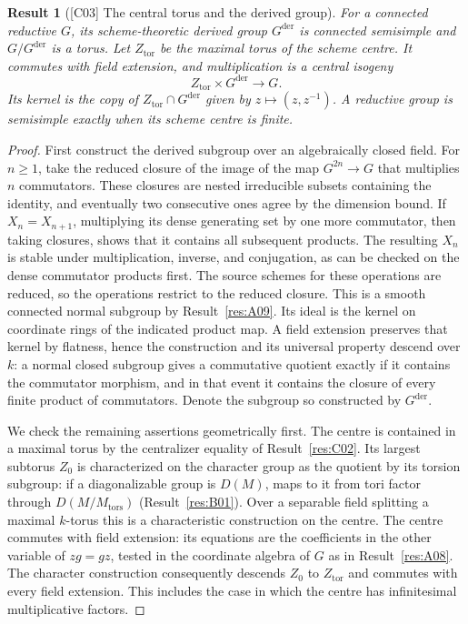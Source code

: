 \documentclass[11pt,a4paper,openany,oneside]{book}
\theoremstyle{resultstyle}
\newtheorem{statement}{Result}[chapter]
\newenvironment{result}[2]{\clubpenalty=10000\begin{statement}[\textnormal{[#1]} #2]\leavevmode\label{res:#1}\ignorespaces}{\end{statement}}
\theoremstyle{definition}
\numberwithin{equation}{chapter}
\begin{document}
\begin{result}{C03}{The central torus and the derived group}
For a connected reductive \(G\), its scheme-theoretic derived group \(G^{\mathrm{der}}\) is connected semisimple and \(G/G^{\mathrm{der}}\) is a torus. Let \(Z_{\mathrm{tor}}\) be the maximal torus of the scheme centre. It commutes with field extension, and multiplication is a central isogeny
\[
 Z_{\mathrm{tor}}\times G^{\mathrm{der}}\longrightarrow G.
\]
Its kernel is the copy of \(Z_{\mathrm{tor}}\cap G^{\mathrm{der}}\) given by \(z\mapsto (z,z^{-1})\). A reductive group is semisimple exactly when its scheme centre is finite.
\end{result}

\begin{proof}
First construct the derived subgroup over an algebraically
closed field. For \(n\ge1\), take the reduced closure of the image
of the map \(G^{2n}\to G\) that multiplies \(n\) commutators.
These closures are nested irreducible subsets containing the identity,
and eventually two consecutive ones agree by the dimension bound.
If \(X_n=X_{n+1}\), multiplying its dense generating set by
one more commutator, then taking closures, shows that it contains
all subsequent products. The resulting \(X_n\) is stable under
multiplication, inverse, and conjugation, as can be checked on
the dense commutator products first. The source schemes for these
operations are reduced, so the operations restrict to the reduced
closure. This is a smooth connected normal subgroup by
Result~\ref{res:A09}. Its ideal is the kernel on coordinate rings
of the indicated product map. A field extension preserves that
kernel by flatness, hence the construction and its universal
property descend over \(k\): a normal closed subgroup gives a
commutative quotient exactly if it contains the commutator morphism,
and in that event it contains the closure of every finite product
of commutators. Denote the subgroup so constructed by \(G^{\mathrm{der}}\).

We check the remaining assertions geometrically first. The centre
is contained in a maximal torus by the centralizer equality of
Result~\ref{res:C02}. Its largest subtorus \(Z_0\) is characterized
on the character group as the quotient by its torsion subgroup:
if a diagonalizable group is \(D(M)\), maps to it from tori
factor through \(D(M/M_{\mathrm{tors}})\)
(Result~\ref{res:B01}). Over a separable field splitting a maximal
\(k\)-torus this is a characteristic construction on the centre.
The centre commutes with field extension: its equations
are the coefficients in the other variable of \(zg=gz\),
tested in the coordinate algebra of \(G\) as in
Result~\ref{res:A08}. The character construction consequently
descends \(Z_0\) to \(Z_{\mathrm{tor}}\) and commutes with every
field extension. This includes the case in which the centre has
infinitesimal multiplicative factors.


\end{proof}
\end{document}
